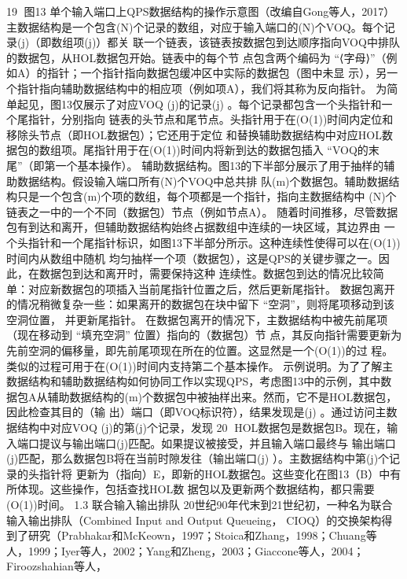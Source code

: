                                                          19
图13 单个输入端口上QPS数据结构的操作示意图（改编自Gong等人，2017）
主数据结构是一个包含(N)个记录的数组，对应于输入端口的(N)个VOQ。每个记录(j)（即数组项(j)）都关
联一个链表，该链表按数据包到达顺序指向VOQ中排队的数据包，从HOL数据包开始。链表中的每个节
点包含两个编码为 “⟨字母⟩”（例如A）的指针；一个指针指向数据包缓冲区中实际的数据包（图中未显
示），另一个指针指向辅助数据结构中的相应项（例如项A），我们将其称为反向指针。
为简单起见，图13仅展示了对应VOQ (j)的记录(j) 。每个记录都包含一个头指针和一个尾指针，分别指向
链表的头节点和尾节点。头指针用于在(O(1))时间内定位和移除头节点（即HOL数据包）；它还用于定位
和替换辅助数据结构中对应HOL数据包的数组项。尾指针用于在(O(1))时间内将新到达的数据包插入
“VOQ的末尾”（即第一个基本操作）。
辅助数据结构。图13的下半部分展示了用于抽样的辅助数据结构。假设输入端口所有(N)个VOQ中总共排
队(m)个数据包。辅助数据结构只是一个包含(m)个项的数组，每个项都是一个指针，指向主数据结构中
(N)个链表之一中的一个不同（数据包）节点（例如节点A）。
随着时间推移，尽管数据包有到达和离开，但辅助数据结构始终占据数组中连续的一块区域，其边界由
一个头指针和一个尾指针标识，如图13下半部分所示。这种连续性使得可以在(O(1))时间内从数组中随机
均匀抽样一个项（数据包），这是QPS的关键步骤之一。因此，在数据包到达和离开时，需要保持这种
连续性。数据包到达的情况比较简单：对应新数据包的项插入当前尾指针位置之后，然后更新尾指针。
数据包离开的情况稍微复杂一些：如果离开的数据包在块中留下 “空洞”，则将尾项移动到该空洞位置，
并更新尾指针。
在数据包离开的情况下，主数据结构中被先前尾项（现在移动到 “填充空洞” 位置）指向的（数据包）节
点，其反向指针需要更新为先前空洞的偏移量，即先前尾项现在所在的位置。这显然是一个(O(1))的过
程。类似的过程可用于在(O(1))时间内支持第二个基本操作。
示例说明。为了了解主数据结构和辅助数据结构如何协同工作以实现QPS，考虑图13中的示例，其中数
据包A从辅助数据结构的(m)个数据包中被抽样出来。然而，它不是HOL数据包，因此检查其目的（输
出）端口（即VOQ标识符），结果发现是(j) 。通过访问主数据结构中对应VOQ (j)的第(j)个记录，发现
                                                    20
HOL数据包是数据包B。现在，输入端口提议与输出端口(j)匹配。如果提议被接受，并且输入端口最终与
输出端口(j)匹配，那么数据包B将在当前时隙发往（输出端口(j) ）。主数据结构中第(j)个记录的头指针将
更新为（指向）E，即新的HOL数据包。这些变化在图13（B）中有所体现。这些操作，包括查找HOL数
据包以及更新两个数据结构，都只需要(O(1))时间。
1.3 联合输入输出排队
20世纪90年代末到21世纪初，一种名为联合输入输出排队（Combined Input and Output Queueing，
CIOQ）的交换架构得到了研究（Prabhakar和McKeown，1997；Stoica和Zhang，1998；Chuang等
人，1999；Iyer等人，2002；Yang和Zheng，2003；Giaccone等人，2004；Firoozshahian等人，
